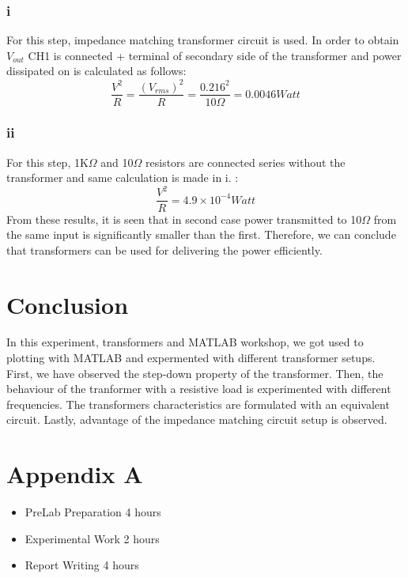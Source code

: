 \documentclass[letterpaper,12pt]{article}
\begin{document}
\subsubsection{i}
For this step, impedance matching transformer circuit is used. In order to obtain \(V_{out}\) CH1 is connected + terminal of secondary side of the transformer and power dissipated on is calculated as follows:
\[\frac{V^2}{R} = \frac{(V_{rms})^2}{R} = \frac{0.216^2}{10\Omega } = 0.0046 Watt\]   

\subsubsection{ii}
For this step, 1K\(\Omega \) and 10\(\Omega \) resistors are connected series without the transformer and same calculation is made in i. :
\[\frac{V^2}{R} = 4.9 \times 10^{-4} Watt\]
 From these results, it is seen that in second case power transmitted to 10\(\Omega \) from the same input is significantly smaller than the first. Therefore, we can conclude that transformers can be used for delivering the power efficiently. 

\section{Conclusion}
In this experiment, transformers and MATLAB workshop, we got used to plotting with MATLAB and expermented with different transformer setups. First, we have observed the step-down property of the transformer. Then, the behaviour of the tranformer with a resistive load is experimented with different frequencies. The transformers characteristics are formulated with an equivalent circuit. Lastly, advantage of the impedance matching circuit setup is observed.
\section*{Appendix A}
\begin{itemize}
    \item PreLab Preparation 4 hours
    \item Experimental Work 2  hours
    \item Report Writing 4 hours
\end{itemize}
\end{document}
